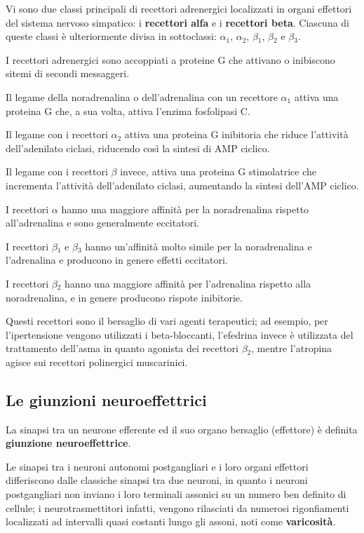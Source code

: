 \documentclass[]{article}
\begin{document}
Vi sono due classi principali di recettori adrenergici localizzati in
organi effettori del sistema nervoso simpatico: i \textbf{recettori
alfa} e i \textbf{recettori beta}. Ciascuna di queste classi è
ulteriormente divisa in sottoclassi: \(\alpha\)\(_1\), \(\alpha\)\(_2\),
\(\beta\)\(_1\), \(\beta\)\(_2\) e \(\beta\)\(_3\).

I recettori adrenergici sono accoppiati a proteine G che attivano o
inibiscono sitemi di secondi messaggeri.

Il legame della noradrenalina o dell'adrenalina con un recettore
\textbf{\(\alpha\)\(_1\)} attiva una proteina G che, a sua volta, attiva
l'enzima fosfolipasi C.

Il legame con i recettori \textbf{\(\alpha\)\(_2\)} attiva una proteina
G inibitoria che riduce l'attività dell'adenilato ciclasi, riducendo
così la sintesi di AMP ciclico.

Il legame con i recettori \textbf{\(\beta\)} invece, attiva una proteina
G stimolatrice che incrementa l'attività dell'adenilato ciclasi,
aumentando la sintesi dell'AMP ciclico.

I recettori \(\alpha\) hanno una maggiore affinità per la noradrenalina
rispetto all'adrenalina e sono generalmente eccitatori.

I recettori \(\beta\)\(_1\) e \(\beta\)\(_3\) hanno un'affinità molto
simile per la noradrenalina e l'adrenalina e producono in genere effetti
eccitatori.

I recettori \(\beta\)\(_2\) hanno una maggiore affinità per l'adrenalina
rispetto alla noradrenalina, e in genere producono rispote inibitorie.

Questi recettori sono il bersaglio di vari agenti terapeutici; ad
esempio, per l'ipertensione vengono utilizzati i beta-bloccanti,
l'efedrina invece è utilizzata del trattamento dell'asma in quanto
agonista dei recettori \(\beta\)\(_2\), mentre l'atropina agisce sui
recettori polinergici muscarinici.

\subsection{Le giunzioni
neuroeffettrici}\label{le-giunzioni-neuroeffettrici}

La sinapsi tra un neurone efferente ed il suo organo bersaglio
(effettore) è definita \textbf{giunzione neuroeffettrice}.

Le sinapsi tra i neuroni autonomi postgangliari e i loro organi
effettori differiscono dalle classiche sinapsi tra due neuroni, in
quanto i neuroni postgangliari non inviano i loro terminali assonici su
un numero ben definito di cellule; i neurotrasmettitori infatti, vengono
rilasciati da numerosi rigonfiamenti localizzati ad intervalli quasi
costanti lungo gli assoni, noti come \textbf{varicosità}.
\end{document}
